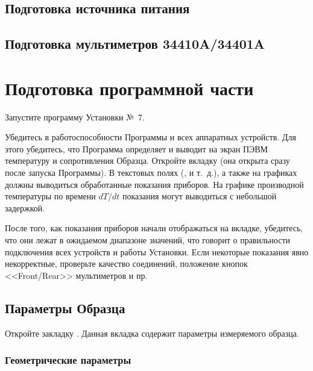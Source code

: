 \documentclass[12pt, a4paper, twocolumn]{report}
\begin{document}
\subsection{Подготовка источника питания}



\subsection{Подготовка мультиметров 34410A/34401A}



\section{Подготовка программной части}

Запустите программу Установки №~7.

Убедитесь в работоспособности Программы и всех аппаратных устройств. Для этого убедитесь, что Программа определяет и выводит на экран ПЭВМ температуру и сопротивления Образца. Откройте вкладку  (она открыта сразу после запуска Программы). В текстовых полях (,  и т.~д.), а также на графиках должны выводиться обработанные показания приборов. На графике производной температуры по времени $dT/dt$ показания могут выводиться с небольшой задержкой.

После того, как показания приборов начали отображаться на вкладке, убедитесь, что они лежат в ожидаемом диапазоне значений, что говорит о правильности подключения всех устройств и работы Установки. Если некоторые показания явно некорректные, проверьте качество соединений, положение кнопок <<Front/Rear>> мультиметров и пр.

\subsection{Параметры Образца}

Откройте закладку . Данная вкладка содержит параметры измеряемого образца.

\subsubsection{Геометрические параметры}
\label{sec_geom_params}


\end{document}
